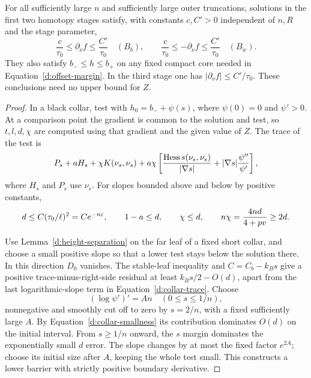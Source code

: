 \begin{proposition}\label{d:collars}
For all sufficiently large $n$ and sufficiently large outer
truncations, solutions in the first two homotopy stages satisfy,
with constants $c,C'>0$ independent of $n,R$ and the stage parameter,
\begin{equation}\label{d:collar-slopes}
 \frac c{\tau_0}\le\partial_\nu f\le\frac{C'}{\tau_0}\quad(B_b),\qquad
 \frac c{\tau_0}\le-\partial_\nu f\le\frac{C'}{\tau_0}\quad(B_w).
\end{equation}
They also satisfy $b_-\le h\le b_+$ on any fixed compact core needed
in Equation~\eqref{d:offset-margin}.  In the third stage one has
$|\partial_\nu f|\le C'/\tau_0$.  These conclusions need no upper
bound for $Z$.
\end{proposition}
\begin{proof}
In a black collar, test with $h_0=b_-+\psi(s)$, where
$\psi(0)=0$ and $\psi'>0$.  At a comparison point the gradient is
common to the solution and test, so $t,l,d,\chi$ are computed using
that gradient and the given value of $Z$.  The trace of the test is
\begin{equation}\label{d:collar-trace}
 P_s+aH_s+\chi K(\nu_s,\nu_s)
 +a\chi\left[
  \frac{\operatorname{Hess} s(\nu_s,\nu_s)}{|\nabla s|}
                  +|\nabla s|\frac{\psi''}{\psi'}\right],
\end{equation}
where $H_s$ and $P_s$ use $\nu_s$.  For slopes bounded above and
below by positive constants,
\begin{equation}\label{d:collar-smallness}
 d\le C(\tau_0/\ell)^2=C e^{-n\varepsilon},\qquad
 1-a\le d,\qquad \chi\le d,\qquad
 n\chi=\frac{4nd}{4+pv}\ge2d.
\end{equation}

Use Lemma~\ref{d:height-separation} on the far leaf of a fixed short
collar, and choose a small positive slope so that a lower test stays
below the solution there.  In this direction $D_0$ vanishes.
The stable-leaf inequality and $C=C_b-k_Bs$ give a positive
trace-minus-right-side residual at least $k_Bs/2-O(d)$, apart from
the last logarithmic-slope term in Equation~\eqref{d:collar-trace}.
Choose
\[
 (\log\psi')'=An\quad(0\le s\le1/n),
\]
nonnegative and smoothly cut off to zero by $s=2/n$, with a fixed
sufficiently large $A$.  By Equation~\eqref{d:collar-smallness} its
contribution dominates $O(d)$ on the initial interval.  From
$s\ge1/n$ onward, the $s$ margin dominates the exponentially small
$d$ error.  The slope changes by at most the fixed factor $e^{2A}$;
choose its initial size after $A$, keeping the whole test small.
This constructs a lower barrier with strictly positive boundary
derivative.


\end{proof}
